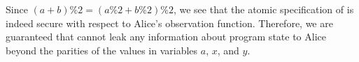 \noindent{}Since {\small{}$(a+b)\%2 = (a\%2 + b\%2)\%2$}, we see that the atomic
specification of  is indeed secure with respect to Alice's 
observation function. Therefore, we are guaranteed that  cannot
leak any information about program state to Alice beyond the parities 
of the values in variables $a$, $x$, and $y$.

\begin{comment}
\subsection{Declassify Average Salary}
To enforce a security policy declassifying the average salary of many
employees at a company, we use a strategy similar to the previous
example. Consider the following function that computes the average
(for the purposes of this example, ignore the possibility of integer
overflow):
{\small\begin{alltt}
  void avg() \{
      t = 0;
      for (i = 0; i < n; i++)
         t = t + s[i];
      a = t/n; \}
\end{alltt}}%
\noindent{}Assume a size-$n$ array of salaries exists starting at the location
pointed to by $s$. Using the notation $\{v_1,...,v_N\}$ to represent
an abstraction of the salary array as a Coq list, we can express the
atomic specification of \ttt{avg} as:
{\small\begin{align*}
& (\sigma,\sigma') \in S_{\ttt{avg}} \iff \\
& \qquad \exists N,v_1,...,v_N \such
\sigma(n) = N \land
\sigma(s) = \{v_1,...,v_N\} \land
\sigma' = 
\sigma[t \hookrightarrow (\Sigma~v_i); \,\,
       a \hookrightarrow (\Sigma~v_i)/N]\end{align*}}%
\noindent{}Alice's observation function specifies the policy, saying that
she can observe the average of all the salaries says that both the average salary
$a$ and the total number of salaries $n$ are observable, but it 
omits any information about the salary array $s$:
{\small\[\observe{A}{\sigma} \isdef 
[a \hookrightarrow \sigma(a); \,\,
 n \hookrightarrow \sigma(n)]\]}%
\noindent{}As explained previously,
we prove security by showing that state indistinguishability is preserved 
by the high-level semantics. In this example, we assume that the specification of
\ttt{add} constitutes the entirety of the machine semantics. Hence we
must prove:
{\small\begin{align*}
& \observe{A}{\sigma_1} = \observe{A}{\sigma_2} \land
(\sigma_1,\sigma_1') \in S_{\ttt{add}} \land (\sigma_2,\sigma_2') \in S_{\ttt{add}} \\

\end{comment}
